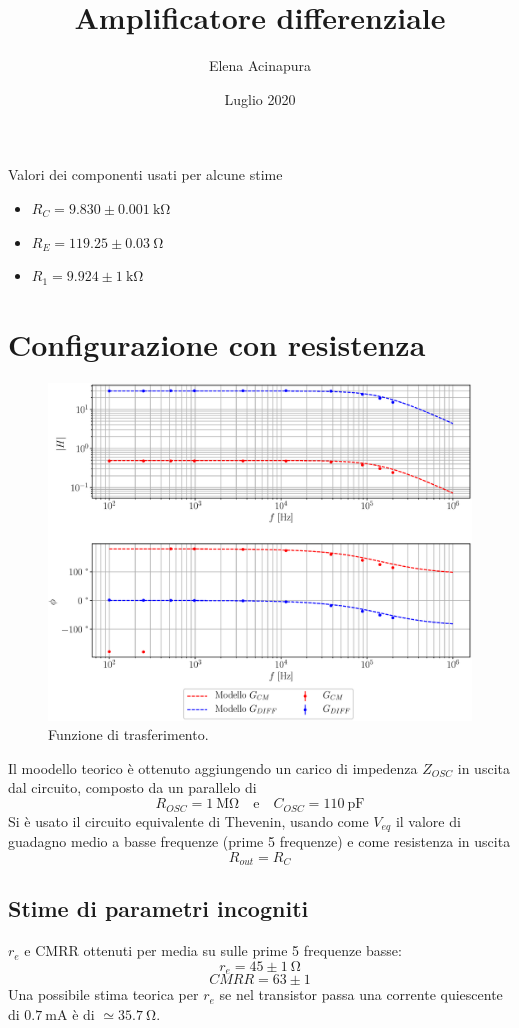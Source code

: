 \documentclass{article}
\title{Amplificatore differenziale}
\date{Luglio 2020}
\author{Elena Acinapura}
\begin{document}
\maketitle

Valori dei componenti usati per alcune stime
\begin{itemize}
    \item ${R_C} = 9.830\pm0.001~\si{\kilo\ohm}$ 
    \item ${R_E} = 119.25\pm0.03~\si{\ohm}$
    \item $R_1 = 9.924\pm1~\si{\kilo\ohm}$
\end{itemize}


\section*{Configurazione con resistenza}
\begin{figure}[h!]
    \centering
    \includegraphics[scale = 0.6]{Grafici/resistenza.eps}
    \caption{Funzione di trasferimento.}
    \label{fig:resistenza}
\end{figure}
Il moodello teorico è ottenuto aggiungendo un carico di impedenza $Z_{OSC}$ in uscita dal circuito, composto da un parallelo di $$R_{OSC} = 1~\si{\mega\ohm} \quad \text{e} \quad C_{OSC} = 110~\si{\pico\farad}$$
Si è usato il circuito equivalente di Thevenin, usando come $V_{eq}$ il valore di guadagno medio a basse frequenze (prime 5 frequenze) e come resistenza in uscita $$R_{out} = R_C$$

\subsection*{Stime di parametri incogniti}
$r_e$ e CMRR ottenuti per media su sulle prime 5 frequenze basse:
$$ r_e = 45\pm 1~\si{\ohm}$$
$$ CMRR = 63\pm 1$$
Una possibile stima teorica per $r_e$ se nel transistor passa una corrente quiescente di $0.7~\si{\milli\ampere}$ è di $\simeq 35.7~\si{\ohm}$.
\end{document}
